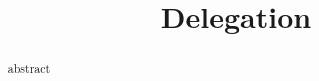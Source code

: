 \documentclass{llncs}
\title{Delegation}
\date{}
\institute{}
\begin{document}
\maketitle

\begin{abstract}
abstract
\end{abstract}





%
%
%

\end{document}
